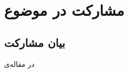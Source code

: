 \chapter{مشارکت در موضوع}

\section{بیان مشارکت}
در مقاله‌ی 
\cite{zimmer2019exploiting}
\cite{osband2016deep}